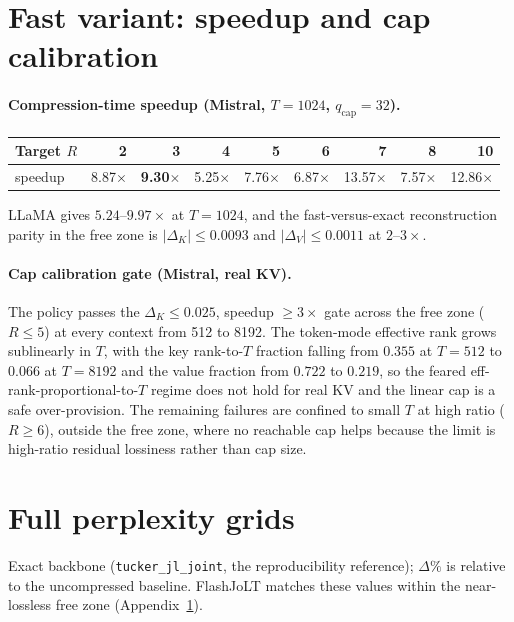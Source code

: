 \documentclass{article}
\begin{document}
\section{Fast variant: speedup and cap calibration}
\label{app:fast}
\paragraph{Compression-time speedup (Mistral, $T{=}1024$, $q_{\mathrm{cap}}{=}32$).}

\begin{table}[htbp]
  \centering
  \begin{tabular}{lrrrrrrrr}
    \toprule
    Target $R$ & 2 & 3 & 4 & 5 & 6 & 7 & 8 & 10 \\
    \midrule
    speedup & 8.87$\times$ & \textbf{9.30$\times$} & 5.25$\times$ & 7.76$\times$ & 6.87$\times$ & 13.57$\times$ & 7.57$\times$ & 12.86$\times$ \\
    \bottomrule
  \end{tabular}
\end{table}

LLaMA gives $5.24$--$9.97\times$ at $T{=}1024$, and the fast-versus-exact reconstruction parity in the free zone is $|\Delta_K| \le 0.0093$ and $|\Delta_V| \le 0.0011$ at $2$--$3\times$.

\paragraph{Cap calibration gate (Mistral, real KV).} The policy passes the $\Delta_K \le 0.025$, speedup $\ge 3\times$ gate across the free zone ($R \le 5$) at every context from 512 to 8192. The token-mode effective rank grows sublinearly in $T$, with the key rank-to-$T$ fraction falling from $0.355$ at $T{=}512$ to $0.066$ at $T{=}8192$ and the value fraction from $0.722$ to $0.219$, so the feared eff-rank-proportional-to-$T$ regime does not hold for real KV and the linear cap is a safe over-provision. The remaining failures are confined to small $T$ at high ratio ($R \ge 6$), outside the free zone, where no reachable cap helps because the limit is high-ratio residual lossiness rather than cap size.

\section{Full perplexity grids}
\label{app:ppl}
Exact backbone (\texttt{tucker\_jl\_joint}, the reproducibility reference); $\Delta\%$ is relative to the uncompressed baseline. FlashJoLT matches these values within the near-lossless free zone (Appendix~\ref{app:fast}).
\end{document}
